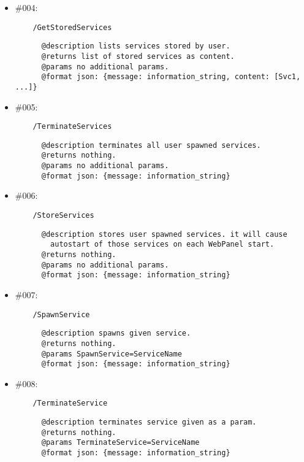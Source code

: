 \documentclass[11pt,a4paper]{scrartcl}
\begin{document}
\begin{itemize}
    \item \#004:
      \begin{verbatim}
    /GetStoredServices
      \end{verbatim}
      \begin{verbatim}
      @description lists services stored by user.
      @returns list of stored services as content.
      @params no additional params.
      @format json: {message: information_string, content: [Svc1, ...]}
      \end{verbatim}

    \item \#005:
      \begin{verbatim}
    /TerminateServices
      \end{verbatim}
      \begin{verbatim}
      @description terminates all user spawned services.
      @returns nothing.
      @params no additional params.
      @format json: {message: information_string}
      \end{verbatim}

    \item \#006:
      \begin{verbatim}
    /StoreServices
      \end{verbatim}
      \begin{verbatim}
      @description stores user spawned services. it will cause
        autostart of those services on each WebPanel start.
      @returns nothing.
      @params no additional params.
      @format json: {message: information_string}
      \end{verbatim}

    \item \#007:
      \begin{verbatim}
    /SpawnService
      \end{verbatim}
      \begin{verbatim}
      @description spawns given service.
      @returns nothing.
      @params SpawnService=ServiceName
      @format json: {message: information_string}
      \end{verbatim}

    \item \#008:
      \begin{verbatim}
    /TerminateService
      \end{verbatim}
      \begin{verbatim}
      @description terminates service given as a param.
      @returns nothing.
      @params TerminateService=ServiceName
      @format json: {message: information_string}
      \end{verbatim}


\end{itemize}
\end{document}
